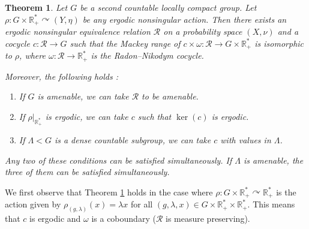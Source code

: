 \documentclass[a4paper,11pt]{amsart}
\numberwithin{equation}{section}
\newtheorem{theorem}{Theorem}[section]
\theoremstyle{definition}
\newcommand{\R}{\mathbb{R}}
\newcommand{\cR}{\mathcal{R}}
\begin{document}
\begin{theorem} \label{model ergodic kernel dense subgroup}
    Let $G$ be a second countable locally compact group. Let $\rho : G \times \R^*_+ \curvearrowright (Y,\eta)$ be any ergodic nonsingular action. Then there exists an ergodic nonsingular equivalence relation $\cR$ on a probability space $(X,\nu)$ and a cocycle $c : \cR \rightarrow G$ such that the Mackey range of $c \times \omega : \cR \rightarrow G \times \R^*_+$ is isomorphic to $\rho$, where $\omega : \cR \rightarrow \R^*_+$ is the Radon--Nikodym cocycle.

    Moreover, the following holds :
    \begin{enumerate}
        \item If $G$ is amenable, we can take $\cR$ to be amenable.
        \item If $\rho|_{\R^*_+}$ is ergodic, we can take $c$ such that $\ker(c)$ is ergodic.
        \item If $\Lambda < G$ is a dense countable subgroup, we can take $c$ with values in $\Lambda$.
    \end{enumerate}
    Any two of these conditions can be satisfied simultaneously. If $\Lambda$ is amenable, the three of them can be satisfied simultaneously.
\end{theorem}

We first observe that Theorem \ref{model ergodic kernel dense subgroup} holds in the case where $\rho : G \times \R^*_+ \curvearrowright \R^*_+$ is the action given by $\rho_{(g,\lambda)}(x)=\lambda x$ for all $(g,\lambda,x) \in G \times \R^*_+ \times \R^*_+$. This means that $c$ is ergodic and $\omega$ is a coboundary ($\cR$ is measure preserving).
\end{document}
